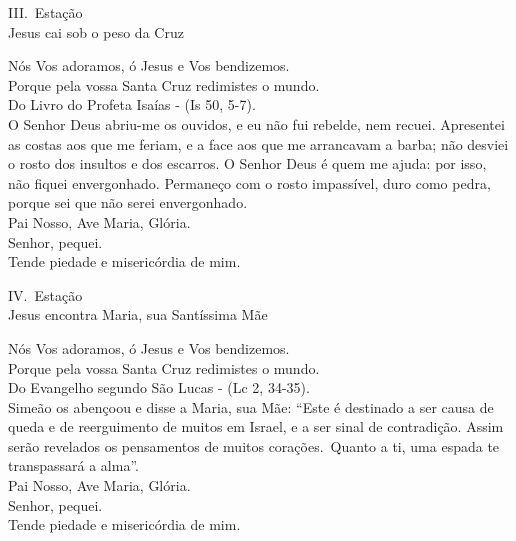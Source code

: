 \documentclass{book}
\begin{document}
\begin{center}
    III.\ Estação \\ Jesus cai sob o peso da Cruz
\end{center}
\begin{flushleft}
    \VbarRed{} Nós Vos adoramos, ó Jesus e Vos bendizemos. \\
    \RbarRed{} Porque pela vossa Santa Cruz redimistes o mundo.
    \vspace{.2cm} \\
    Do Livro do Profeta Isaías - (\textcolor{VioletRed2}{Is 50, 5-7}).
    \vspace{.2cm} \\
    O Senhor Deus abriu-me os ouvidos, e eu não fui rebelde, nem recuei. Apresentei as costas aos que me feriam, e a face aos que me arrancavam a barba; não desviei o rosto dos insultos e dos escarros. O Senhor Deus é quem me ajuda: por isso, não fiquei envergonhado. Permaneço com o rosto impassível, duro como pedra, porque sei que não serei envergonhado.
    \vspace{.2cm} \\
    Pai Nosso, Ave Maria, Glória.
    \vspace{.2cm} \\
    \VbarRed{} Senhor, pequei. \\
    \RbarRed{} Tende piedade e misericórdia de mim.
\end{flushleft}\begin{center}
    IV.\ Estação \\ Jesus encontra Maria, sua Santíssima Mãe
\end{center}
\begin{flushleft}
    \VbarRed{} Nós Vos adoramos, ó Jesus e Vos bendizemos. \\
    \RbarRed{} Porque pela vossa Santa Cruz redimistes o mundo.
    \vspace{.2cm} \\
    Do Evangelho segundo São Lucas - (\textcolor{VioletRed2}{Lc 2, 34-35}).
    \vspace{.2cm} \\
    Simeão os abençoou e disse a Maria, sua Mãe: ``Este é destinado a ser causa de queda e de reerguimento de muitos em Israel, e a ser sinal de contradição. Assim serão revelados os pensamentos de muitos corações.\ Quanto a ti, uma espada te transpassará a alma''.
    \vspace{.2cm} \\
    Pai Nosso, Ave Maria, Glória.
    \vspace{.2cm} \\
    \VbarRed{} Senhor, pequei. \\
    \RbarRed{} Tende piedade e misericórdia de mim.
\end{flushleft}
\end{document}
